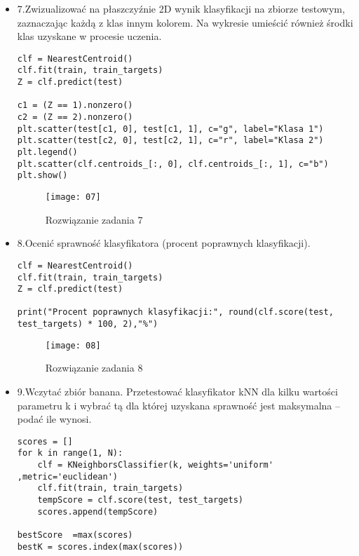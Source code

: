 \documentclass[12pt,a4paper]{article}
\begin{document}
\begin{itemize}
                        \item 7.Zwizualizować na płaszczyźnie 2D wynik klasyfikacji na zbiorze testowym, zaznaczając każdą z klas innym kolorem. Na wykresie umieścić również środki klas uzyskane w procesie uczenia.
	\begin{lstlisting}
clf = NearestCentroid()
clf.fit(train, train_targets)
Z = clf.predict(test)

c1 = (Z == 1).nonzero()
c2 = (Z == 2).nonzero()
plt.scatter(test[c1, 0], test[c1, 1], c="g", label="Klasa 1")
plt.scatter(test[c2, 0], test[c2, 1], c="r", label="Klasa 2")
plt.legend()
plt.scatter(clf.centroids_[:, 0], clf.centroids_[:, 1], c="b")
plt.show()
	\end{lstlisting}
		\begin{figure}[h]
                        \texttt{[image: 07]}
                        \centering
			\caption{Rozwiązanie zadania 7}
			\label{fig:fig7}
                \end{figure}
                \clearpage

                \item 8.Ocenić sprawność klasyfikatora (procent poprawnych klasyfikacji).
	\begin{lstlisting}
clf = NearestCentroid()
clf.fit(train, train_targets)
Z = clf.predict(test)

print("Procent poprawnych klasyfikacji:", round(clf.score(test, test_targets) * 100, 2),"%")
	\end{lstlisting}
		\begin{figure}[h]
                        \texttt{[image: 08]}
                        \centering
			\caption{Rozwiązanie zadania 8}
			\label{fig:fig8}
                \end{figure}
                \clearpage
                \item 9.Wczytać zbiór banana. Przetestować klasyfikator kNN dla kilku wartości parametru k i wybrać tą dla której uzyskana sprawność jest maksymalna – podać ile wynosi.
	\begin{lstlisting}
scores = []
for k in range(1, N):
    clf = KNeighborsClassifier(k, weights='uniform' ,metric='euclidean')
    clf.fit(train, train_targets)
    tempScore = clf.score(test, test_targets)
    scores.append(tempScore)

bestScore  =max(scores)
bestK = scores.index(max(scores))
        

\end{lstlisting}
\end{itemize}
\end{document}
